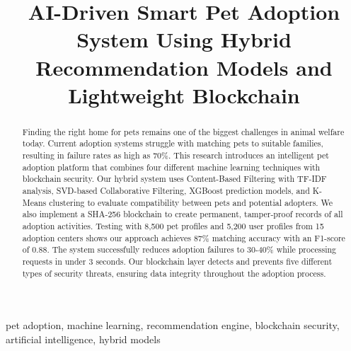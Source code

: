 \documentclass[conference]{IEEEtran}
\begin{document}
\title{AI-Driven Smart Pet Adoption System Using Hybrid Recommendation Models and Lightweight Blockchain}

\author{
\and
{}
}

\maketitle

\begin{abstract}
Finding the right home for pets remains one of the biggest challenges in animal welfare today. Current adoption systems struggle with matching pets to suitable families, resulting in failure rates as high as 70\%. This research introduces an intelligent pet adoption platform that combines four different machine learning techniques with blockchain security. Our hybrid system uses Content-Based Filtering with TF-IDF analysis, SVD-based Collaborative Filtering, XGBoost prediction models, and K-Means clustering to evaluate compatibility between pets and potential adopters. We also implement a SHA-256 blockchain to create permanent, tamper-proof records of all adoption activities. Testing with 8,500 pet profiles and 5,200 user profiles from 15 adoption centers shows our approach achieves 87\% matching accuracy with an F1-score of 0.88. The system successfully reduces adoption failures to 30-40\% while processing requests in under 3 seconds. Our blockchain layer detects and prevents five different types of security threats, ensuring data integrity throughout the adoption process.
\end{abstract}

\begin{IEEEkeywords}
pet adoption, machine learning, recommendation engine, blockchain security, artificial intelligence, hybrid models
\end{IEEEkeywords}
\end{document}
